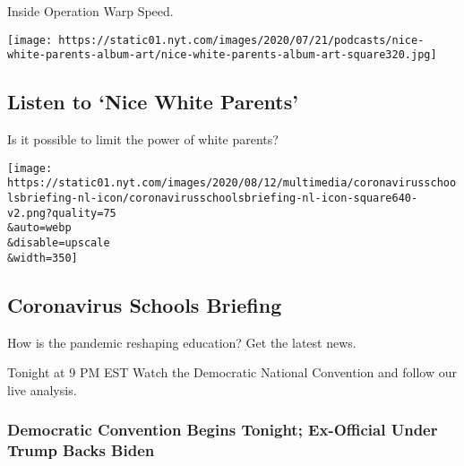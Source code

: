 Inside Operation Warp Speed.

\href{/2020/08/13/podcasts/nice-white-parents-school.html}{}

\texttt{[image: https://static01.nyt.com/images/2020/07/21/podcasts/nice-white-parents-album-art/nice-white-parents-album-art-square320.jpg]}

\href{/2020/08/13/podcasts/nice-white-parents-school.html}{}

\hypertarget{listen-to-nice-white-parents}{%
\subsection{Listen to `Nice White
Parents'}\label{listen-to-nice-white-parents}}

Is it possible to limit the power of white parents?

\href{https://www.nytimes.com/newsletters/coronavirus-schools-briefing}{}

\texttt{[image: https://static01.nyt.com/images/2020/08/12/multimedia/coronavirusschoolsbriefing-nl-icon/coronavirusschoolsbriefing-nl-icon-square640-v2.png?quality=75\\\&auto=webp\\\&disable=upscale\\\&width=350]}

\href{https://www.nytimes.com/newsletters/coronavirus-schools-briefing}{}

\hypertarget{coronavirus-schools-briefing}{%
\subsection{Coronavirus Schools
Briefing}\label{coronavirus-schools-briefing}}

How is the pandemic reshaping education? Get the latest news.

\href{https://www.nytimes.com/live/2020/08/17/us/dnc-convention}{}

Tonight at 9 PM EST Watch the Democratic National Convention and follow
our live analysis.

\href{https://www.nytimes.com/live/2020/08/17/us/dnc-convention}{}

\hypertarget{democratic-convention-begins-tonight-ex-official-under-trump-backs-biden}{%
\subsubsection{Democratic Convention Begins Tonight; Ex-Official Under
Trump Backs
Biden}\label{democratic-convention-begins-tonight-ex-official-under-trump-backs-biden}}

\href{https://www.nytimes.com/live/2020/08/17/us/dnc-convention}{}

